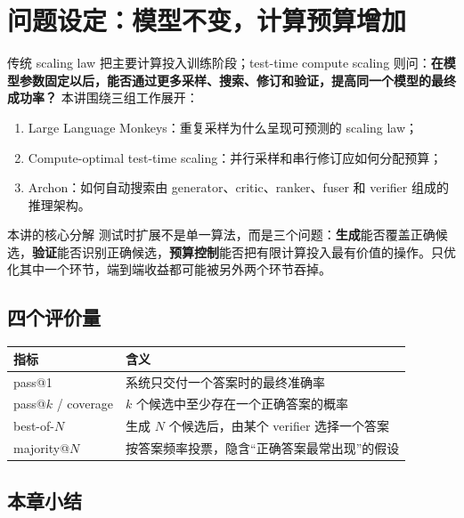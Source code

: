 \documentclass[a4paper]{article}
\begin{document}
\makelecturetitle

\section{问题设定：模型不变，计算预算增加}

传统 scaling law 把主要计算投入训练阶段；test-time compute scaling 则问：\textbf{在模型参数固定以后，能否通过更多采样、搜索、修订和验证，提高同一个模型的最终成功率？} 本讲围绕三组工作展开：

\begin{enumerate}
    \item Large Language Monkeys：重复采样为什么呈现可预测的 scaling law；
    \item Compute-optimal test-time scaling：并行采样和串行修订应如何分配预算；
    \item Archon：如何自动搜索由 generator、critic、ranker、fuser 和 verifier 组成的推理架构。
\end{enumerate}

\begin{importantbox}{本讲的核心分解}
测试时扩展不是单一算法，而是三个问题：\textbf{生成}能否覆盖正确候选，\textbf{验证}能否识别正确候选，\textbf{预算控制}能否把有限计算投入最有价值的操作。只优化其中一个环节，端到端收益都可能被另外两个环节吞掉。
\end{importantbox}

\subsection{四个评价量}

\begin{table}[H]
\centering
\begin{tabular}{p{3.1cm}p{10.5cm}}
\toprule
\textbf{指标} & \textbf{含义} \\
\midrule
pass@1 & 系统只交付一个答案时的最终准确率 \\
pass@$k$ / coverage & $k$ 个候选中至少存在一个正确答案的概率 \\
best-of-$N$ & 生成 $N$ 个候选后，由某个 verifier 选择一个答案 \\
majority@$N$ & 按答案频率投票，隐含“正确答案最常出现”的假设 \\
\bottomrule
\end{tabular}
\end{table}

\subsection{本章小结}
\end{document}
